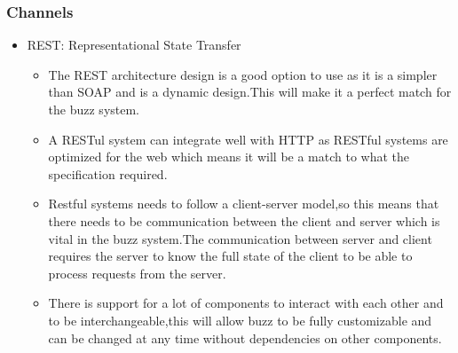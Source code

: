 
\subsubsection{Channels}
\begin{itemize}
\item REST: Representational State Transfer
\begin{itemize}
\item The REST architecture design is a good option to use as it is a simpler than SOAP and is a dynamic design.This will make it a perfect match for the buzz system.
\item A RESTul system can integrate well with HTTP as RESTful systems are optimized for the web which means it will be a match to what the specification required.
\item Restful systems needs to follow a client-server model,so this means that there needs to be communication between the client and server which is vital in the buzz system.The communication between server and client requires the server to know the full state of the client to be able to process requests from the server.
\item There is support for a lot of components to interact with each other and to be interchangeable,this will allow buzz to be fully customizable and can be changed at any time without dependencies on other components.
\end{itemize}
\end{itemize}
